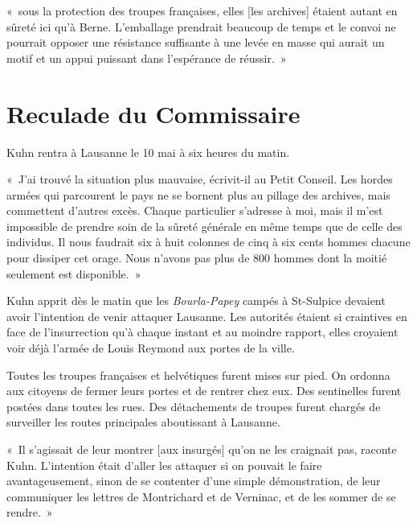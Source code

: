 \documentclass[french,twoside]{book} %
\newenvironment{quoteblock}%
  {\begin{quoting}}
  {\end{quoting}}
\newenvironment{quotebar}{%
    \def\FrameCommand{{\color{rubric!10!}\vrule width 0.5em} \hspace{0.9em}}%
    \def\OuterFrameSep{\itemsep} %
    \MakeFramed {\advance\hsize-\width \FrameRestore}
  }%
  {%
    \endMakeFramed
  }
\renewenvironment{quoteblock}%
  {%
    \savenotes
    \setstretch{0.9}
    \normalfont
    \begin{quotebar}
  }
  {%
    \end{quotebar}
    \spewnotes
  }
\begin{document}
\begin{quoteblock}
\noindent « sous la protection des troupes françaises, elles [les archives] étaient autant en sûreté ici qu’à Berne. L’emballage prendrait beaucoup de temps et le convoi ne pourrait opposer une résistance suffisante à une levée en masse qui aurait un motif et un appui puissant dans l’espérance de réussir. »\end{quoteblock}

\section[{Reculade du Commissaire}]{Reculade du Commissaire}
\noindent Kuhn rentra à Lausanne le 10 mai à six heures du matin.\par

\begin{quoteblock}
 \noindent « J’ai trouvé la situation plus mauvaise, écrivit-il au Petit Conseil. Les hordes armées qui parcourent le pays ne se bornent plus au pillage des archives, mais commettent d’autres excès. Chaque particulier s’adresse à moi, mais il m’est impossible de prendre soin de la sûreté générale en même temps que de celle des individus. Il nous faudrait six à huit colonnes de cinq à six cents hommes chacune pour dissiper cet orage. Nous n’avons pas plus de 800 hommes dont la moitié seulement est disponible. »
 \end{quoteblock}

\noindent Kuhn apprit dès le matin que les \emph{Bourla-Papey} campés à St-Sulpice devaient avoir l’intention de venir attaquer Lausanne. Les autorités étaient si craintives en face de l’insurrection qu’à chaque instant et au moindre rapport, elles croyaient voir déjà l’armée de Louis Reymond aux portes de la ville.\par
Toutes les troupes françaises et helvétiques furent mises sur pied. On ordonna aux citoyens de fermer leurs portes et de rentrer chez eux. Des sentinelles furent postées dans toutes les rues. Des détachements de troupes furent chargés de surveiller les routes principales aboutissant à Lausanne.\par

\begin{quoteblock}
 \noindent « Il s’agissait de leur montrer [aux insurgés] qu’on ne les craignait pas, raconte Kuhn. L’intention était d’aller les attaquer si on pouvait le faire avantageusement, sinon de se contenter d’une simple démonstration, de leur communiquer les lettres de Montrichard et de Verninac, et de les sommer de se rendre. »
 \end{quoteblock}
\end{document}
